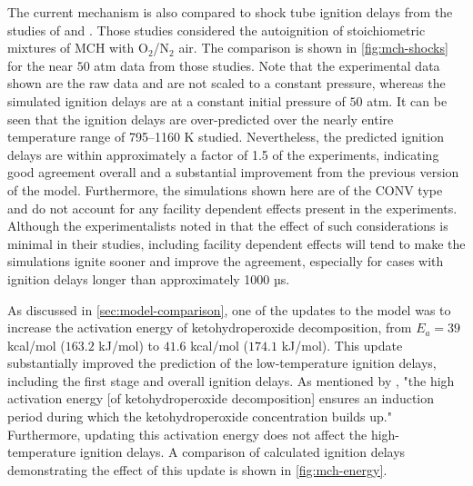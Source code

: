 \documentclass[12pt, letterpaper]{article}
\begin{document}
The current mechanism is also compared to shock tube ignition delays from the 
studies of \textcite{Vasu2009} and \textcite{Vanderover2009}. Those studies 
considered the autoignition of stoichiometric mixtures of MCH with O$_2$/N$_2$ 
air. The comparison is shown in \autoref{fig:mch-shocks} for the near $50$ atm 
data from those studies. Note that the experimental data shown are the raw 
data and are not scaled to a constant pressure, whereas the simulated 
ignition delays are at a constant initial pressure of $50$ atm. It can be seen 
that the ignition delays are over-predicted over the nearly entire temperature 
range of 795–1160 K studied. Nevertheless, the predicted ignition delays are 
within approximately a factor of 1.5 of the experiments, indicating good 
agreement overall and a substantial improvement from the previous version of 
the model. Furthermore, the simulations shown here are of the CONV type and 
do not account for any facility dependent effects present in the experiments. 
Although the experimentalists noted in \cite{Vasu2009,Vanderover2009} that the 
effect of such considerations is minimal in their studies, including facility 
dependent effects will tend to make the simulations ignite sooner and improve 
the agreement, especially for cases with ignition delays longer than 
approximately 1000 µs.

As discussed in \autoref{sec:model-comparison}, one of the updates to the model 
was to increase the activation energy of ketohydroperoxide decomposition, from 
$E_a=39$ kcal/mol ($163.2$ kJ/mol) to $41.6$ kcal/mol ($174.1$ kJ/mol). This 
update substantially improved the prediction of the low-temperature ignition 
delays, including the first stage and overall ignition delays. As mentioned by 
\textcite{Curran2002}, "the high activation energy [of ketohydroperoxide 
decomposition] ensures an induction period during which the ketohydroperoxide 
concentration builds up." Furthermore, updating this activation energy does not 
affect the high-temperature ignition delays. A comparison of calculated 
ignition delays demonstrating the effect of this update is shown in 
\autoref{fig:mch-energy}.
\end{document}
